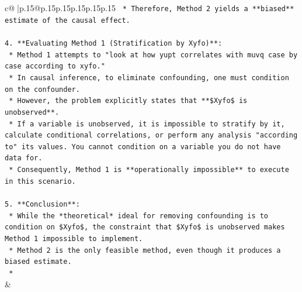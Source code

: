 \documentclass{article}
\begin{document}
{\begin{supertabular}{c@{$\;$}|p{.15\linewidth}@{}p{.15\linewidth}p{.15\linewidth}p{.15\linewidth}p{.15\linewidth}p{.15\linewidth}}
{{{\texttt{    *   Therefore, Method 2 yields a **biased** estimate of the causal effect.} \\
\\ 
\texttt{4.  **Evaluating Method 1 (Stratification by Xyfo)**:} \\
\texttt{    *   Method 1 attempts to "look at how yupt correlates with muvq case by case according to xyfo."} \\
\texttt{    *   In causal inference, to eliminate confounding, one must condition on the confounder.} \\
\texttt{    *   However, the problem explicitly states that **\$Xyfo\$ is unobserved**.} \\
\texttt{    *   If a variable is unobserved, it is impossible to stratify by it, calculate conditional correlations, or perform any analysis "according to" its values. You cannot condition on a variable you do not have data for.} \\
\texttt{    *   Consequently, Method 1 is **operationally impossible** to execute in this scenario.} \\
\\ 
\texttt{5.  **Conclusion**:} \\
\texttt{    *   While the *theoretical* ideal for removing confounding is to condition on \$Xyfo\$, the constraint that \$Xyfo\$ is unobserved makes Method 1 impossible to implement.} \\
\texttt{    *   Method 2 is the only feasible method, even though it produces a biased estimate.} \\
\texttt{    *} \\
            }
        }
    }
    & \\ \\


\end{supertabular}}
\end{document}
